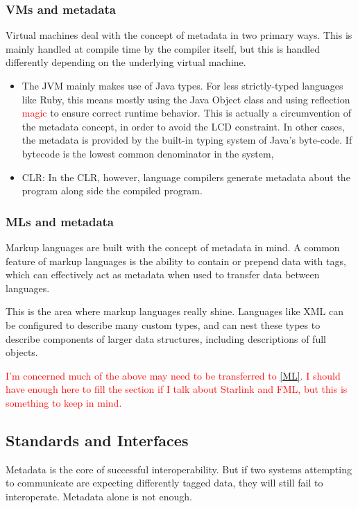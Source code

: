 \documentclass{sig-alternate}
\newcommand{\mycomment}[1]{\textcolor{red}{#1}}
\begin{document}
{\subsubsection*{VMs and metadata}
Virtual machines deal with the concept of metadata in two primary ways. This is mainly handled at compile time by the compiler itself, but this is handled differently depending on the underlying virtual machine.
\begin{itemize}
\item The JVM mainly makes use of Java types. For less strictly-typed languages like Ruby, this means mostly using the Java Object class and using reflection \mycomment{magic} to ensure correct runtime behavior. This is actually a circumvention of the metadata concept, in order to avoid the LCD constraint. In other cases, the metadata is provided by the built-in typing system of Java's byte-code. If bytecode is the lowest common denominator in the system, 
\item CLR: In the CLR, however, language compilers generate metadata about the program along side the compiled program\cite{Hamilton:2003}.
\end{itemize}

\subsubsection*{MLs and metadata}
Markup languages are built with the concept of metadata in mind. A common feature of markup languages is the ability to contain or prepend data with tags, which can effectively act as metadata when used to transfer data between languages.

This is the area where markup languages really shine. Languages like XML can be configured to describe many custom types, and can nest these types to describe components of larger data structures, including descriptions of full objects.

\mycomment{I'm concerned much of the above may need to be transferred to \ref{ML}. I should have enough here to fill the section if I talk about Starlink and FML, but this is something to keep in mind.}

\subsection{Standards and Interfaces}\label{standards}
Metadata is the core of successful interoperability. But if two systems attempting to communicate are expecting differently tagged data, they will still fail to interoperate. Metadata alone is not enough.

}
\end{document}
